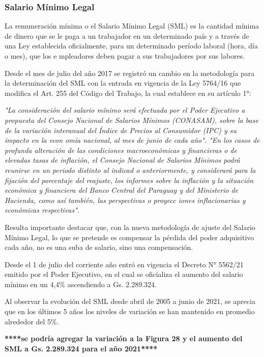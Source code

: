 \subsubsection{Salario Mínimo Legal}

La remuneración mínima o el Salario Mínimo Legal (SML) es la cantidad
mínima de dinero que se le paga a un trabajador en un determinado país y
a través de una Ley establecida oficialmente, para un determinado
período laboral (hora, día o mes), que los e mpleadores deben pagar a
sus trabajadores por sus labores.

Desde el mes de julio del año 2017 se registró un cambio en la
metodología para la determinación del SML con la entrada en vigencia de
la Ley 5764/16 que modifica el Art. 255 del Código del Trabajo, la cual
establece en su artículo 1°:

\textit{"La consideración del salario mínimo será efectuada por el Poder Ejecutivo a propuesta del Consejo Nacional de Salarios Mínimos (CONASAM), sobre la base de la variación interanual del Índice de Precios al Consumidor (IPC) y su impacto en la econ
omía nacional, al mes de junio de cada año". "En los casos de profunda alteración de las condiciones macroeconómicas y financieras o de elevadas tasas de inflación, el Consejo Nacional de Salarios Mínimos podrá reunirse en un periodo distinto al indicad
o anteriormente, y considerará para la fijación del porcentaje del reajuste, los  informes sobre la inflación y la situación económica y financiera del Banco Central del Paraguay y del Ministerio de Hacienda, como así también, las perspectivas o proyecc
iones inflacionarias y económicas respectivas".}

Resulta importante destacar que, con la nueva metodología de ajuste del
Salario Mínimo Legal, lo que se pretende es compensar la pérdida del
poder adquisitivo cada año, no es una suba de salario, sino una
compensación.

Desde el 1 de julio del corriente año entró en vigencia el Decreto N°
5562/21 emitido por el Poder Ejecutivo, en el cual se oficializa el
aumento del salario mínimo en un 4,4\% ascendiendo a Gs. 2.289.324.

Al observar la evolución del SML desde abril de 2005 a junio de 2021, se
aprecia que en los últimos 5 años los niveles de variación se han
mantenido en promedio alrededor del 5\%.

\textbf{****se podría agregar la variación a la Figura 28 y el aumento del SML a Gs. 2.289.324 para el año 2021****}

